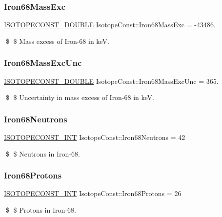 \subsubsection{\texorpdfstring{Iron68\+Mass\+Exc}{Iron68MassExc}}
{\footnotesize\ttfamily \mbox{\hyperlink{group___isotope_const-_macros_ga8f45a7272ce02c0b4c65c44636ed719a}{I\+S\+O\+T\+O\+P\+E\+C\+O\+N\+S\+T\+\_\+\+D\+O\+U\+B\+LE}} Isotope\+Const\+::\+Iron68\+Mass\+Exc = -\/43486.}

\$ \$ Mass excess of Iron-\/68 in keV. \mbox{\label{group___isotope_const-_iron-_fe68_ga457622117dc9a7d6d1971cf5d77f937d}} 
\subsubsection{\texorpdfstring{Iron68\+Mass\+Exc\+Unc}{Iron68MassExcUnc}}
{\footnotesize\ttfamily \mbox{\hyperlink{group___isotope_const-_macros_ga8f45a7272ce02c0b4c65c44636ed719a}{I\+S\+O\+T\+O\+P\+E\+C\+O\+N\+S\+T\+\_\+\+D\+O\+U\+B\+LE}} Isotope\+Const\+::\+Iron68\+Mass\+Exc\+Unc = 365.}

\$ \$ Uncertainty in mass excess of Iron-\/68 in keV. \mbox{\label{group___isotope_const-_iron-_fe68_gaf95d5eceb00630cd26ca19f9e79baaa1}} 
\subsubsection{\texorpdfstring{Iron68\+Neutrons}{Iron68Neutrons}}
{\footnotesize\ttfamily \mbox{\hyperlink{group___isotope_const-_macros_ga5f18360b3e99483a35c32d789e62621c}{I\+S\+O\+T\+O\+P\+E\+C\+O\+N\+S\+T\+\_\+\+I\+NT}} Isotope\+Const\+::\+Iron68\+Neutrons = 42}

\$ \$ Neutrons in Iron-\/68. \mbox{\label{group___isotope_const-_iron-_fe68_ga942f0c74d79a7b897f88ab645b202bb8}} 
\subsubsection{\texorpdfstring{Iron68\+Protons}{Iron68Protons}}
{\footnotesize\ttfamily \mbox{\hyperlink{group___isotope_const-_macros_ga5f18360b3e99483a35c32d789e62621c}{I\+S\+O\+T\+O\+P\+E\+C\+O\+N\+S\+T\+\_\+\+I\+NT}} Isotope\+Const\+::\+Iron68\+Protons = 26}

\$ \$ Protons in Iron-\/68. 
